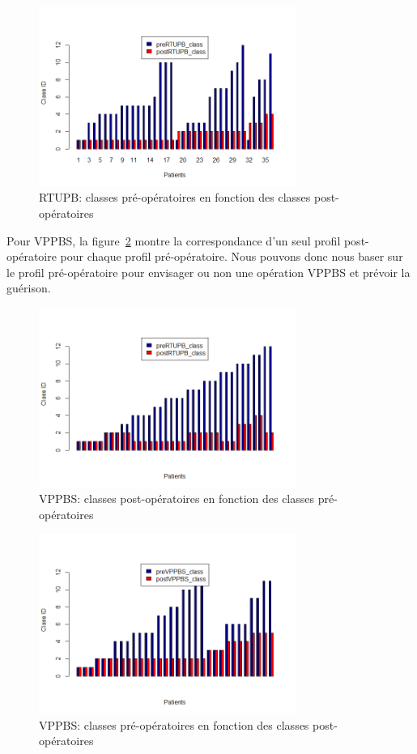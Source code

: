 \begin{figure}[H]
\centering
\includegraphics[width=0.75\textwidth]{../Fig/RTUPB/rtupb-histogram-post-pre.png}
\caption{RTUPB: classes pré-opératoires en fonction des classes post-opératoires}
\label{fig-rtupb-histogram2}
\end{figure}

Pour VPPBS, la figure~\ref{fig-vppbs-histogram} montre la correspondance d'un seul profil post-opératoire pour chaque profil pré-opératoire. Nous pouvons donc nous baser sur le profil pré-opératoire pour envisager ou non une opération VPPBS et prévoir la guérison.

\begin{figure}[H]
\centering
\includegraphics[width=0.75\textwidth]{../Fig/VPPBS/vppbs-histogram-pre-post.png}
\caption{VPPBS: classes post-opératoires en fonction des classes pré-opératoires}
\label{fig-vppbs-histogram}
\end{figure}

\begin{figure}[H]
\centering
\includegraphics[width=0.75\textwidth]{../Fig/VPPBS/vppbs-histogram-post-pre.png}
\caption{VPPBS: classes pré-opératoires en fonction des classes post-opératoires}
\label{fig-vppbs-histogram2}
\end{figure}

